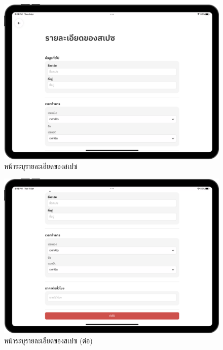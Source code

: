 \begin{figure}[ht]
    \begin{center}
    \includegraphics[width=5.5in]{./image/Flowider_place_info_1.png}
    \end{center}
    \caption[Flowider place info 1]{หน้าระบุรายละเอียดของสเปซ}
    \label{fig:Flowider_place_info_1}
\end{figure}
\begin{figure}[ht]
    \begin{center}
    \includegraphics[width=5.5in]{./image/Flowider_place_info_2.png}
    \end{center}
    \caption[Flowider place info 2]{หน้าระบุรายละเอียดของสเปซ (ต่อ)}
    \label{fig:Flowider_place_info_2}
\end{figure}
